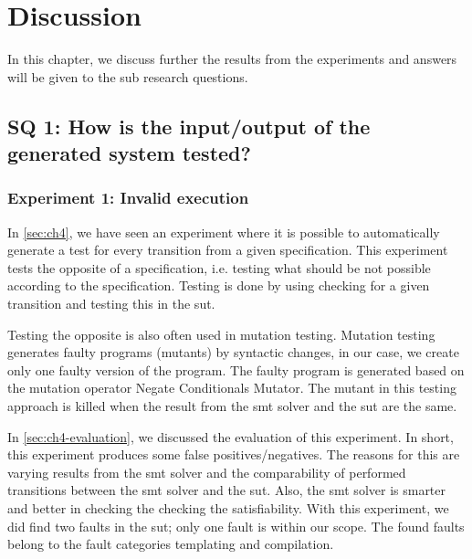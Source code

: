 \chapter{Discussion}\label{sec:ch6}

In this chapter, we discuss further the results from the experiments and answers
will be given to the sub research questions.

\section{SQ 1: How is the input/output of the generated system tested?}

\subsection{Experiment 1: Invalid execution}
In \autoref{sec:ch4}, we have seen an experiment where it is possible to
automatically generate a test for every transition from a given specification.
This experiment tests the opposite of a specification, i.e. testing what should
be not possible according to the specification. Testing is done by using
checking for a given transition and testing this in the \gls{sut}.

Testing the opposite is also often used in mutation testing. Mutation testing
generates faulty programs (mutants) by syntactic changes, in our case, we create
only one faulty version of the program. The faulty program is generated based on
the mutation operator Negate Conditionals Mutator. The mutant in this testing
approach is killed when the result from the \gls{smt} solver and the \gls{sut}
are the same.

In \autoref{sec:ch4-evaluation}, we discussed the evaluation of this experiment.
In short, this experiment produces some false positives/negatives. The reasons
for this are varying results from the \gls{smt} solver and the comparability of
performed transitions between the \gls{smt} solver and the \gls{sut}. Also, the
\gls{smt} solver is smarter and better in checking the checking the
satisfiability. With this experiment, we did find two faults in the \gls{sut};
only one fault is within our scope. The found faults belong to the fault categories
templating and compilation.

